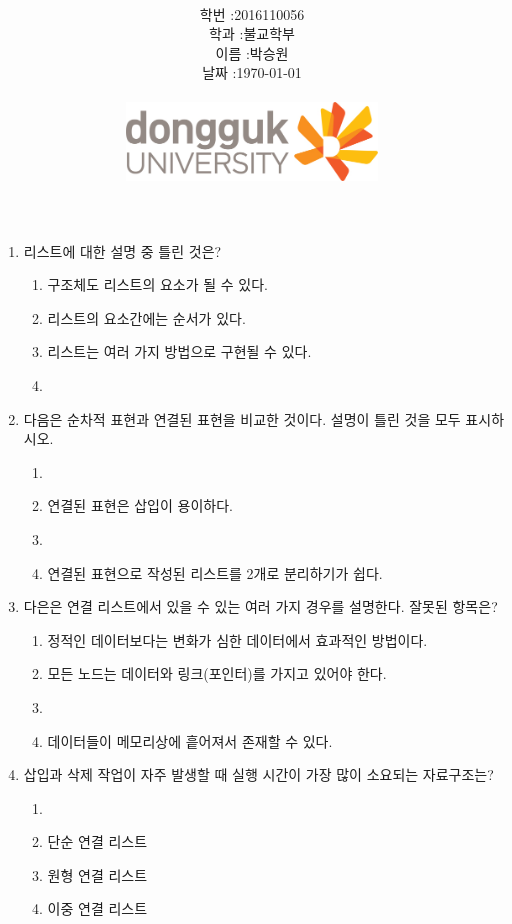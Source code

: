 \documentclass[11pt,a4paper]{article}
\title{
	\centering
	\pgfornament[width=12cm,color=teal]{84}\\
	\vspace{1cm}
	\fontsize{50}{50} \selectfont {자료구조와 실습\\4장 리스트 연습문제}\\
		\pgfornament[width=12cm,color=teal]{88}\\
	\vfill}
\author{
	\LARGE
	\begin{tabular}{rl}
		\hline
		학번 : & 2016110056\\ 
		학과 : & 불교학부 \\
		이름 : & 박승원\\
		날짜 : & \today\\
		\hline
	\end{tabular}\vspace{2cm}
	\\
\includegraphics[width=0.5\textwidth]{logo.jpg}
	}
\date{}
\begin{document}
\maketitle


\newpage


\noindent
\begin{enumerate}
	

\item 리스트에 대한 설명 중 틀린 것은?
\begin{enumerate}

	\item 구조체도 리스트의 요소가 될 수 있다.
	\item 리스트의 요소간에는 순서가 있다.
	\item 리스트는 여러 가지 방법으로 구현될 수 있다.
	\item {}
\end{enumerate}

\item 다음은 순차적 표현과 연결된 표현을 비교한 것이다. 설명이 틀린 것을 모두 표시하시오.
	\begin{enumerate}
	\item {}
	\item 연결된 표현은 삽입이 용이하다.
	\item {}
	\item 연결된 표현으로 작성된 리스트를 2개로 분리하기가 쉽다.
	\end{enumerate}
	
\item 다은은 연결 리스트에서 있을 수 있는 여러 가지 경우를 설명한다. 잘못된 항목은?
	\begin{enumerate}
		\item 정적인 데이터보다는 변화가 심한 데이터에서 효과적인 방법이다.
		\item 모든 노드는 데이터와 링크(포인터)를 가지고 있어야 한다.
		\item {}
		\item 데이터들이 메모리상에 흩어져서 존재할 수 있다.
	\end{enumerate}

\item 삽입과 삭제 작업이 자주 발생할 때 실행 시간이 가장 많이 소요되는 자료구조는?
	\begin{enumerate}
		\item {}
		\item 단순 연결 리스트
		\item 원형 연결 리스트
		\item 이중 연결 리스트
	\end{enumerate}


\end{enumerate}
\end{document}
